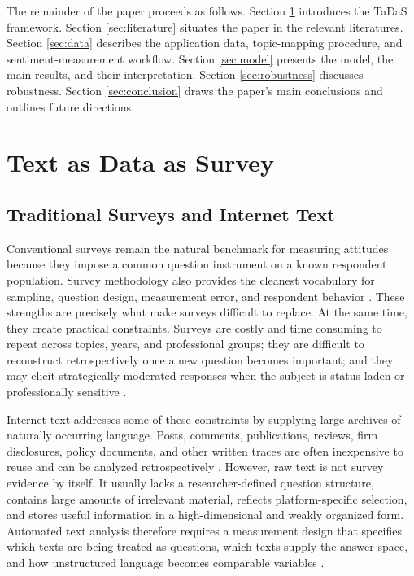 \documentclass[11pt]{article}
\begin{document}
The remainder of the paper proceeds as follows. Section \ref{sec:tadas} introduces the TaDaS framework. Section \ref{sec:literature} situates the paper in the relevant literatures. Section \ref{sec:data} describes the application data, topic-mapping procedure, and sentiment-measurement workflow. Section \ref{sec:model} presents the model, the main results, and their interpretation. Section \ref{sec:robustness} discusses robustness. Section \ref{sec:conclusion} draws the paper's main conclusions and outlines future directions.

\section{Text as Data as Survey}
\label{sec:tadas}

\subsection{Traditional Surveys and Internet Text}

Conventional surveys remain the natural benchmark for measuring attitudes because they impose a common question instrument on a known respondent population. Survey methodology also provides the cleanest vocabulary for sampling, question design, measurement error, and respondent behavior \citep{groves2009}. These strengths are precisely what make surveys difficult to replace. At the same time, they create practical constraints. Surveys are costly and time consuming to repeat across topics, years, and professional groups; they are difficult to reconstruct retrospectively once a new question becomes important; and they may elicit strategically moderated responses when the subject is status-laden or professionally sensitive \citep{bertrand2001,tourangeau2007}.

Internet text addresses some of these constraints by supplying large archives of naturally occurring language. Posts, comments, publications, reviews, firm disclosures, policy documents, and other written traces are often inexpensive to reuse and can be analyzed retrospectively \citep{gentzkow2019}. However, raw text is not survey evidence by itself. It usually lacks a researcher-defined question structure, contains large amounts of irrelevant material, reflects platform-specific selection, and stores useful information in a high-dimensional and weakly organized form. Automated text analysis therefore requires a measurement design that specifies which texts are being treated as questions, which texts supply the answer space, and how unstructured language becomes comparable variables \citep{grimmer2013}.
\end{document}
